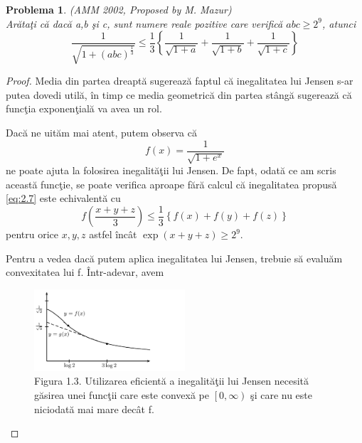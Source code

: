 \documentclass[a4paper,12pt,oneside]{report}
\newtheorem{problem}{Problema}
\begin{document}
\begin{problem}(AMM 2002, Proposed by M. Mazur)\\
Ar\u{a}ta\c{t}i c\u{a} dac\u{a} a,b \c{s}i c, sunt numere reale pozitive care verific\u{a} \(abc \geq 2^{9}\), atunci
\begin{displaymath}
  \frac{1}{\sqrt{1 + \left ( abc \right )^{\frac{1}{3}}}}\leq \frac{1}{3}\left \{ \frac{1}{\sqrt{1 + a}} + \frac{1}{\sqrt{1 + b}} + \frac{1}{\sqrt{1 + c}}\right \}     
  \label{eq:2.7} \tag{2.7}
\end{displaymath}
\end{problem}
\begin{proof}
Media din partea dreapt\u{a} sugereaz\u{a} faptul c\u{a} inegalitatea lui Jensen s-ar putea dovedi util\u{a}, \^{i}n timp ce media geometric\u{a} din partea st\^{a}ng\u{a} sugereaz\u{a} c\u{a} func\c{t}ia exponen\c{t}ial\u{a} va avea un rol.

Dac\u{a} ne uit\u{a}m mai atent, putem observa c\u{a}
\begin{displaymath}
  f\left ( x \right ) = \frac{1}{\sqrt{1+ e^{x}}}
\end{displaymath}
ne poate ajuta la folosirea inegalit\u{a}\c{t}ii lui Jensen. De fapt, odat\u{a} ce am scris aceast\u{a} func\c{t}ie, se poate verifica aproape f\u{a}r\u{a} calcul c\u{a} inegalitatea propus\u{a} \ref{eq:2.7} este echivalent\u{a} cu
\begin{displaymath}
  f\left ( \frac{x + y + z}{3} \right )\leq \frac{1}{3}\left \{ f\left ( x \right ) + f\left ( y \right ) + f\left ( z \right ) \right \}    \label{eq:2.8} \tag{2.8}
\end{displaymath}
pentru orice $x, y, z$ astfel \^{i}nc\^{a}t \(\exp\left ( x + y + z \right )\geq 2^{9}.\)

Pentru a vedea dac\u{a} putem aplica inegalitatea lui Jensen, trebuie s\u{a} evalu\u{a}m convexitatea lui f. \^{I}ntr-adevar, avem

\begin{figure}[htbp]
	\centering
	\includegraphics[width=0.5\textwidth]{fig_pb3.png}
	\caption{Figura 1.3. Utilizarea eficient\u{a} a inegalit\u{a}\c{t}ii lui Jensen necesit\u{a} g\u{a}sirea unei func\c{t}ii care este convex\u{a} pe \(\left [ 0, \infty  \right )\)  \c{s}i care nu este niciodat\u{a} mai mare dec\^{a}t f.}
\end{figure}


\end{proof}
\end{document}
